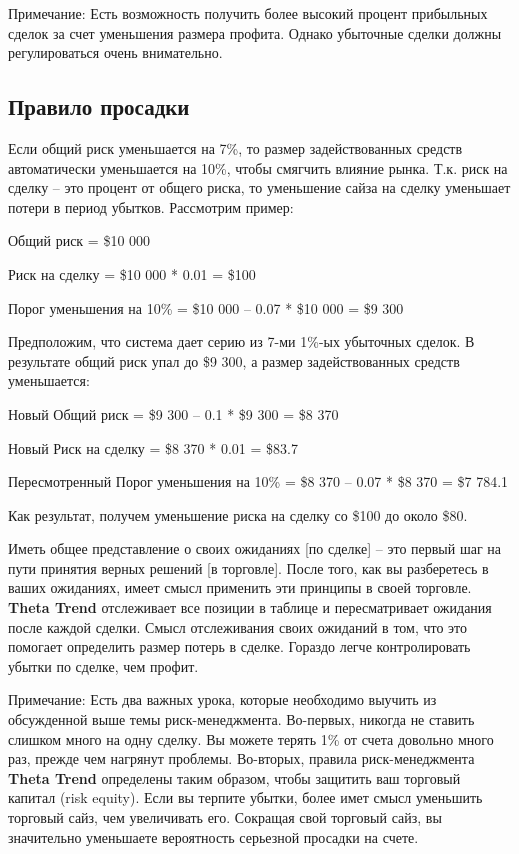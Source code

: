 \documentclass[12pt,DIV=18]{scrartcl}
\begin{document}
Примечание: Есть возможность получить более высокий процент прибыльных сделок за счет уменьшения размера профита. Однако убыточные сделки должны регулироваться очень внимательно.

\subsection*{Правило просадки}

Если общий риск уменьшается на 7\%, то размер задействованных средств автоматически уменьшается на 10\%, чтобы смягчить влияние рынка. Т.к. риск на сделку -- это процент от общего риска, то уменьшение сайза на сделку уменьшает потери в период убытков. Рассмотрим пример:

\bigskip

\setlength{\parindent}{0.5cm}
Общий риск = \$10 000\par
Риск на сделку = \$10 000 * 0.01 = \$100\par
Порог уменьшения на 10\% = \$10 000 -- 0.07 * \$10 000 = \$9 300\par

\bigskip
\setlength{\parindent}{0cm}
Предположим, что система дает серию из 7-ми 1\%-ых убыточных сделок. В результате общий риск упал до \$9 300, а размер задействованных средств уменьшается:

\bigskip

\setlength{\parindent}{0.5cm}
Новый Общий риск = \$9 300 -- 0.1 * \$9 300 = \$8 370\par
Новый Риск на сделку = \$8 370 * 0.01 = \$83.7\par
Пересмотренный Порог уменьшения на 10\% = \$8 370 -- 0.07 * \$8 370 = \$7 784.1\par

\bigskip

Как результат, получем уменьшение риска на сделку со \$100 до около \$80.

\bigskip

Иметь общее представление о своих ожиданиях [по сделке] -- это первый шаг на пути принятия верных решений [в торговле]. После того, как вы разберетесь в ваших ожиданиях, имеет смысл применить эти принципы в своей торговле. \textbf{Theta Trend} отслеживает все позиции в таблице и пересматривает ожидания после каждой сделки. Смысл отслеживания своих ожиданий в том, что это помогает определить размер потерь в сделке. Гораздо легче контролировать убытки по сделке, чем профит.

\bigskip

Примечание: Есть два важных урока, которые необходимо выучить из обсужденной выше темы риск-менеджмента. Во-первых, никогда не ставить слишком много на одну сделку. Вы можете терять 1\% от счета довольно много раз, прежде чем нагрянут проблемы. Во-вторых, правила риск-менеджмента \textbf{Theta Trend} определены таким образом, чтобы защитить ваш торговый капитал (risk equity). Если вы терпите убытки, более имет смысл уменьшить торговый сайз, чем увеличивать его. Сокращая свой торговый сайз, вы значительно уменьшаете вероятность серьезной просадки на счете.
\end{document}
